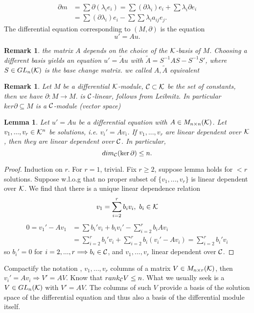 \documentclass[11pt]{article}
\newtheorem{lemma}[thm]{Lemma}
\newtheorem{rmk}[thm]{Remark}
\newcommand{\pd}{\partial}
\newcommand{\calc}{{\cal C}}
\newcommand{\calk}{{\cal K}}
\begin{document}
$$
\begin{aligned}
\pd m & =\sum \pd (\lambda_i e_i)=\sum (\pd \lambda_i)e_i+\sum \lambda_i \pd e_i\\
&=\sum(\pd \lambda_i) e_i-\sum \sum \lambda_i a_{ij} e_j.
\end{aligned}
$$
The differential equation corresponding to $(M,\pd)$ is  the equation
$$
u'=A u.
$$
\begin{rmk}
the matrix $A$ depends on the choice of the $\calk$-basis of $M$. Choosing a different basis yields an equation $u'=\tilde{A}u$ with $\tilde{A}=S^{-1}A S-S^{-1}S'$, where $S\in GL_n(\calk)$ is the base change matrix. we called $A,\tilde{A}$ equivalent
\end{rmk}
\begin{rmk}
Let $M$ be a differential $\calk$-module, $\calc\subset \calk$ be the set of constants, then we have
$
\pd  :M\rightarrow M.
$ 
is $\calc$-linear, follows from Leibnitz.
In particular $ker \pd\subseteq M$ is a $\calc$-module (vector space)
\end{rmk}

\begin{lemma}\label{lem:basis}
Let $u'=A u$ be a differential equation with $A\in M_{n\times n}(\calk)$. Let $v_1,...,v_r\in \calk^n$ be solutions, i.e. $v_i'=A v_i$. If $v_1,...,v_r$ are linear dependent over $\calk$, then they are linear dependent over $\calc$. In particular,
$$
dim_{\calc}(\ker \pd)\leq n.
$$
\end{lemma}
\begin{proof}
Induction on $r$. For $r=1$, trivial. Fix $r\geq 2$, suppose lemma holds for $<r$ solutions. Suppose w.l.o.g that no proper subset of $\{v_1,...,v_r\}$ is linear dependent over $\calk$. We find that there is a unique linear dependence relation 
$$
v_1=\sum_{i=2}^r b_i v_i,\ b_i\in \calk
$$
$$
\begin{aligned}
0=v_1'-A v_1&=\sum b_i'v_i+b_i v_i' -\sum_{i=2}^r b_i A v_i\\
& =\sum^r_{i=2}b_i' v_i+\sum_{i=2}^r b_i(v_i'-A v_i)=\sum_{i=2}
^r b_i' v_i
\end{aligned}
$$
so $b_i'=0$ for $i=2,...,r\Longrightarrow b_i\in\calc$, and $v_1,...,v_r$ linear dependent over $\calc$.
\end{proof}
Compactify the notation , $v_1,...,v_r$ columns of a matrix $V\in M_{n\times r}(\calk)$, then $v_i'=A v_i\Longrightarrow V'=A V$. Know that $rank_\calc V\leq n$.
What we usually seek is a $V\in GL_n(\calk)$ with $V'=A V$. The columns of such $V $ provide a basis of the solution space of the differential equation and thus also a basis of the differential module itself.
\end{document}

